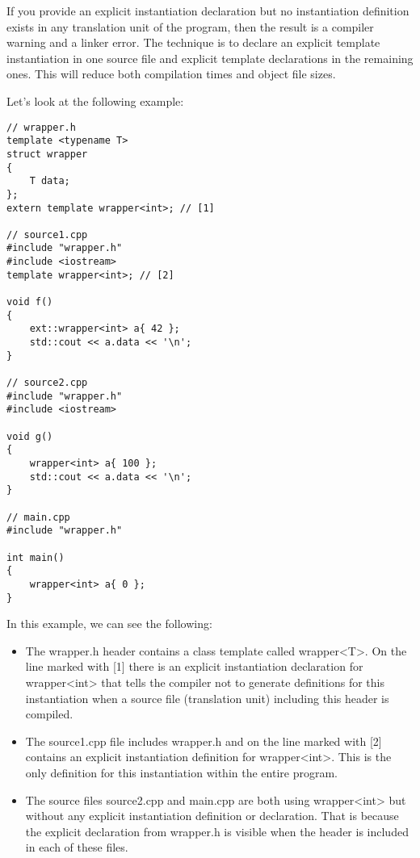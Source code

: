 If you provide an explicit instantiation declaration but no instantiation definition exists in any translation unit of the program, then the result is a compiler warning and a linker error. The technique is to declare an explicit template instantiation in one source file and explicit template declarations in the remaining ones. This will reduce both compilation times and object file sizes.

Let's look at the following example:

\begin{lstlisting}[style=styleCXX]
// wrapper.h
template <typename T>
struct wrapper
{
	T data;
};
extern template wrapper<int>; // [1]

// source1.cpp
#include "wrapper.h"
#include <iostream>
template wrapper<int>; // [2]

void f()
{
	ext::wrapper<int> a{ 42 };
	std::cout << a.data << '\n';
}

// source2.cpp
#include "wrapper.h"
#include <iostream>

void g()
{
	wrapper<int> a{ 100 };
	std::cout << a.data << '\n';
}

// main.cpp
#include "wrapper.h"

int main()
{
	wrapper<int> a{ 0 };
}
\end{lstlisting}

In this example, we can see the following:

\begin{itemize}
\item 
The wrapper.h header contains a class template called wrapper<T>. On the line marked with [1] there is an explicit instantiation declaration for wrapper<int> that tells the compiler not to generate definitions for this instantiation when a source file (translation unit) including this header is compiled.

\item 
The source1.cpp file includes wrapper.h and on the line marked with [2] contains an explicit instantiation definition for wrapper<int>. This is the only definition for this instantiation within the entire program.

\item 
The source files source2.cpp and main.cpp are both using wrapper<int> but without any explicit instantiation definition or declaration. That is because the explicit declaration from wrapper.h is visible when the header is included in each of these files.
\end{itemize}

